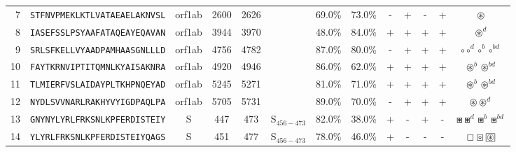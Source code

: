 \begin{tabular}{rcccccccccccc}
7  &  \texttt{STFNVPMEKLKTLVATAEAELAKNVSL} &  orf1ab &   2600 &  2626 &                &                          69.0\% &                           73.0\% &          - &           + &          - &           + &                                                                                                     $ \circledast $ \\
8  &  \texttt{IASEFSSLPSYAAFATAQEAYEQAVAN} &  orf1ab &   3944 &  3970 &                &                          48.0\% &                           84.0\% &          + &           + &          + &           + &                                                                                                   $ \circledast^d $ \\
9  &  \texttt{SRLSFKELLVYAADPAMHAASGNLLLD} &  orf1ab &   4756 &  4782 &                &                          87.0\% &                           80.0\% &          - &           + &          + &           + &                                                                                $ \circ \circ^d \circ^b \circ^{bd} $ \\
10 &  \texttt{FAYTKRNVIPTITQMNLKYAISAKNRA} &  orf1ab &   4920 &  4946 &                &                          86.0\% &                           62.0\% &          + &           + &          + &           + &                                                                                  $ \circledast^b \circledast^{bd} $ \\
11 &  \texttt{TLMIERFVSLAIDAYPLTKHPNQEYAD} &  orf1ab &   5245 &  5271 &                &                          81.0\% &                           71.0\% &          + &           + &          + &           + &                                                                                  $ \circledast^b \circledast^{bd} $ \\
12 &  \texttt{NYDLSVVNARLRAKHYVYIGDPAQLPA} &  orf1ab &   5705 &  5731 &                &                          89.0\% &                           70.0\% &          - &           + &          + &           + &                                                                                       $ \circledast \circledast^d $ \\
13 &  \texttt{GNYNYLYRLFRKSNLKPFERDISTEIY} &       S &    447 &   473 &  S$_{456-473}$ &                          82.0\% &                           38.0\% &          + &           - &          + &           - &                                                                        $ \boxast \boxast^d \boxast^b \boxast^{bd} $ \\
14 &  \texttt{YLYRLFRKSNLKPFERDISTEIYQAGS} &       S &    451 &   477 &  S$_{456-473}$ &                          78.0\% &                           46.0\% &          + &           - &          - &           - &                                            $ \boxempty \boxcircle \setlength{\fboxsep}{0.5pt} \boxed{\circledast} $ \\

\end{tabular}
